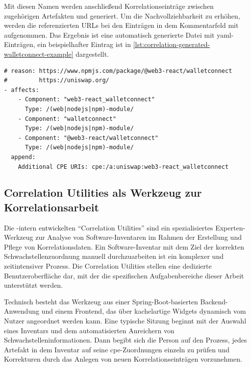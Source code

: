 Mit diesen Namen werden anschließend Korrelationseinträge zwischen zugehörigen Artefakten und  generiert.
Um die Nachvollziehbarkeit zu erhöhen, werden die referenzierten URLs bei den Einträgen in dem Kommentarfeld mit aufgenommen.
Das Ergebnis ist eine automatisch generierte Datei mit \acrshort{yaml}-Einträgen, ein beispielhafter Eintrag ist in \autoref{lst:correlation-generated-walletconnect-example} dargestellt.

\begin{lstlisting}[style=yaml,caption={Automatisch generierte Korrelationseinträge zu react-walletconnect},label={lst:correlation-generated-walletconnect-example}]
# reason: https://www.npmjs.com/package/@web3-react/walletconnect
#         https://uniswap.org/
- affects:
    - Component: "web3-react_walletconnect"
      Type: /(web|nodejs|npm)-module/
    - Component: "walletconnect"
      Type: /(web|nodejs|npm)-module/
    - Component: "@web3-react/walletconnect"
      Type: /(web|nodejs|npm)-module/
  append:
    Additional CPE URIs: cpe:/a:uniswap:web3-react_walletconnect
\end{lstlisting}

\subsection{Correlation Utilities als Werkzeug zur Korrelationsarbeit}\label{subsec:correlation-utilities}

Die \metaeffekt-intern entwickelten \enquote{Correlation Utilities} sind ein spezialisiertes Experten-Werkzeug zur Analyse von Software-Inventaren im Rahmen der Erstellung und Pflege von Korrelationsdaten.
Ein Software-Inventar mit dem Ziel der korrekten Schwachstellenzuordnung manuell durchzuarbeiten ist ein komplexer und zeitintensiver Prozess.
Die Correlation Utilities stellen eine dedizierte Benutzeroberfläche dar, mit der die spezifischen Aufgabenbereiche dieser Arbeit unterstützt werden.

Technisch besteht das Werkzeug aus einer Spring-Boot-basierten Backend-Anwendung und einem Frontend, das über kachelartige Widgets dynamisch vom Nutzer angeordnet werden kann.
Eine typische Sitzung beginnt mit der Auswahl eines Inventars und dem automatisierten Anreichern von Schwachstelleninformationen.
Dann begibt sich die Person auf den Prozess, jedes Artefakt in dem Inventar auf seine \acrshort{cpe}-Zuordnungen einzeln zu prüfen und Korrekturen durch das Anlegen von neuen Korrelationseinträgen vorzunehmen.

